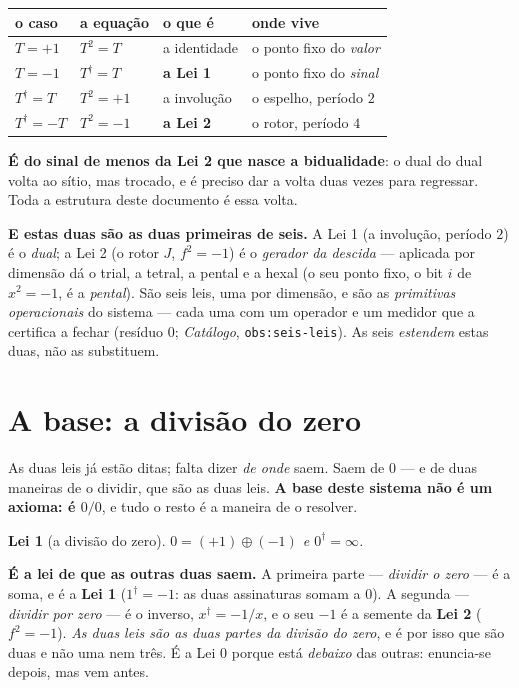 \documentclass[11pt,a4paper]{article}
\newcommand{\code}[1]{\texttt{\small #1}}
\newtheorem{lei}{Lei}
\newcommand{\dg}{^{\dagger}}
\begin{document}
\begin{center}\small
\begin{tabular}{@{}llll@{}}
\toprule
o caso & a equação & o que é & onde vive \\
\midrule
$T=+1$   & $T^2=T$   & a identidade   & o ponto fixo do \emph{valor} \\
$T=-1$   & $T\dg=T$  & \textbf{a Lei 1} & o ponto fixo do \emph{sinal} \\
$T\dg=T$ & $T^2=+1$  & a involução    & o espelho, período $2$ \\
$T\dg=-T$& $T^2=-1$  & \textbf{a Lei 2} & o rotor, período $4$ \\
\bottomrule
\end{tabular}
\end{center}

\noindent \textbf{É do sinal de menos da Lei 2 que nasce a bidualidade}: o dual do dual volta ao
sítio, mas trocado, e é preciso dar a volta duas vezes para regressar. Toda a estrutura deste
documento é essa volta.

\noindent \textbf{E estas duas são as duas primeiras de seis.} A Lei 1 (a involução, período $2$) é o
\emph{dual}; a Lei 2 (o rotor $J$, $f^2=-1$) é o \emph{gerador da descida} --- aplicada por dimensão dá
o trial, a tetral, a pental e a hexal (o seu ponto fixo, o bit $i$ de $x^2=-1$, é a \emph{pental}). São
seis leis, uma por dimensão, e são as \emph{primitivas operacionais} do sistema --- cada uma com um
operador e um medidor que a certifica a fechar (resíduo $0$; \emph{Catálogo}, \code{obs:seis-leis}). As
seis \emph{estendem} estas duas, não as substituem.

\section{A base: a divisão do zero}\label{sec:zero}

As duas leis já estão ditas; falta dizer \emph{de onde} saem. Saem de $0$ --- e de duas maneiras de o
dividir, que são as duas leis. \textbf{A base deste sistema não é um axioma: é $0/0$}, e tudo o resto é
a maneira de o resolver.

\setcounter{lei}{-1}
\begin{lei}[a divisão do zero]\label{lei:zero}
$0=(+1)\oplus(-1)$ \quad e \quad $0\dg=\infty$.
\end{lei}
\setcounter{lei}{2}

\noindent \textbf{É a lei de que as outras duas saem.} A primeira parte --- \emph{dividir o zero} --- é a
soma, e é a \textbf{Lei 1} ($1\dg=-1$: as duas assinaturas somam a $0$). A segunda --- \emph{dividir por
zero} --- é o inverso, $x\dg=-1/x$, e o seu $-1$ é a semente da \textbf{Lei 2} ($f^2=-1$). \emph{As duas
leis são as duas partes da divisão do zero}, e é por isso que são duas e não uma nem três. É a Lei $0$
porque está \emph{debaixo} das outras: enuncia-se depois, mas vem antes.
\end{document}
